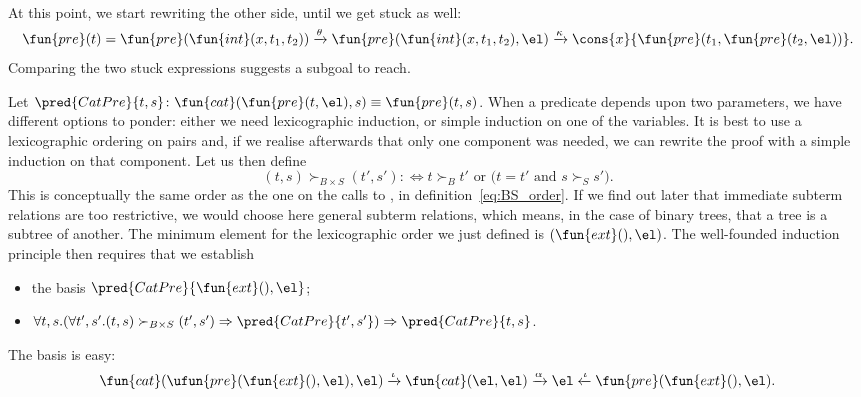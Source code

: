 At this point, we start rewriting the other side, until we get stuck
as well:
\begin{equation*}
  \fun{pre}(t) = \fun{pre}(\fun{int}(x,t_1,t_2))
\xrightarrow{\smash{\theta}} \fun{pre}(\fun{int}(x,t_1,t_2),\el)
\xrightarrow{\smash{\kappa}}
\cons{x}{\fun{pre}(t_1,\fun{pre}(t_2,\el))}.
\index{pre@\fun{pre/1}}
\index{pre@\fun{pre/2}}
\end{equation*}
Comparing the two stuck expressions suggests a subgoal to reach.

Let \(\pred{CatPre}{t,s} \colon \fun{cat}(\fun{pre}(t,\el),s) \equiv
\fun{pre}(t,s)\). When
a predicate depends upon two parameters, we have different options to
ponder: either we need lexicographic induction, or simple induction on
one of the variables. It is best to use a lexicographic
ordering on pairs and, if we
realise afterwards that only one component was needed, we can rewrite
the proof with a simple induction on that component. Let us then
define
\begin{equation*}
(t,s) \succ_{B \times S} (t',s') :\Leftrightarrow \text{\(t \succ_{B}
    t'\) or (\(t = t'\) and \(s \succ_{S} s'\))}.
\end{equation*}
This is conceptually the same order as the one on the calls to
, in
definition~\eqref{eq:BS_order}. If we find out later that immediate
subterm relations are too restrictive, we would choose here general
subterm relations, which means, in the case of binary trees, that a
tree is a subtree of another. The minimum element for the
lexicographic order we just defined is \((\fun{ext}(),\el)\). The
well\hyp{}founded induction principle then requires that we establish
\begin{itemize}

  \item the basis \(\pred{CatPre}{\fun{ext}(),\el}\);

  \item \(\forall t,s. (\forall t',s'.(t,s) \succ_{B \times S} (t',s')
    \Rightarrow \pred{CatPre}{t',s'}) \Rightarrow
    \pred{CatPre}{t,s}\).

\end{itemize}
The basis is easy:
\begin{equation*}
  \fun{cat}(\ufun{pre}(\fun{ext}(),\el),\el)
  \xrightarrow{\smash{\iota}} \fun{cat}(\el,\el)
  \xrightarrow{\smash{\alpha}} \el \xleftarrow{\smash{\iota}}
  \fun{pre}(\fun{ext}(),\el).
\index{cat@\fun{cat/2}}
\end{equation*}
